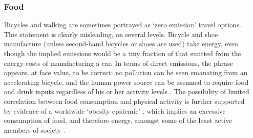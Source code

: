 \subsubsection{Food}  
Bicycles and walking are sometimes portrayed as `zero emission' travel options.
This statement is clearly misleading, on several levels. Bicycle and shoe
manufacture (unless second-hand bicycles or shoes are used) take energy,
even though the implied emissions would be a tiny fraction of that emitted
from the energy costs of manufacturing a car.
In terms of direct emissions, the phrase appears, at face value, to be correct:
no pollution can be seen emanating from an accelerating bicycle, and the human
power source can be assumed to require food and drink inputs regardless of his
or her activity levels \citep{Brand2006}.
The possibility of limited correlation between food consumption and physical
activity is further supported by evidence of a worldwide `obesity epidemic'
\citep{caballero2007global}, which
implies an excessive consumption of food, and therefore energy,
amongst some of the least active members of society \citep{Michaelowa2008}.

